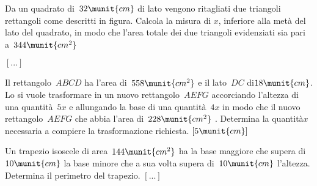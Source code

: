 \begin{htmulticols}{2}
\begin{esercizio}[*]
 \label{ese:3.144}
Da un quadrato di~\(32\munit{cm}\) di lato vengono ritagliati due 
triangoli rettangoli come descritti in figura. 
Calcola la misura di \(x\), inferiore alla metà del lato del quadrato, in 
modo che l'area totale dei due triangoli evidenziati sia pari 
a~\(344\munit{cm^2}\)
\begin{center}
 
\end{center}
\vspace*{-2em}
\hfill\(\left[...\right]\)
\end{esercizio}

\begin{esercizio}[*]
 \label{ese:3.145}
Il rettangolo~\(ABCD\) ha l'area di~\(558\munit{cm^2}\) e il lato~\(DC\) 
di\(18\munit{cm}\). 
Lo si vuole trasformare in un nuovo rettangolo~\(AEFG\) accorciando 
l'altezza di una quantità~\(5x\) e allungando la base di una 
quantità~\(4x\) in modo che il nuovo rettangolo~\(AEFG\) che abbia 
l'area di~\(228\munit{cm^2}~\).
Determina la quantità\( x\) necessaria a compiere la trasformazione 
richiesta.
\hfill\(\left[5\munit{cm}\right]\)
\end{esercizio}
% 

\begin{esercizio}
 \label{ese:3.147}
Un trapezio isoscele di area~\(144\munit{cm^2}\) ha la base maggiore che 
supera di~\(10\munit{cm}\) la base minore che a sua volta supera 
di~\(10\munit{cm}\) l'altezza. 
Determina il perimetro del trapezio.
\hfill\(\left[...\right]\)
\end{esercizio}
% 
%  


\end{htmulticols}
